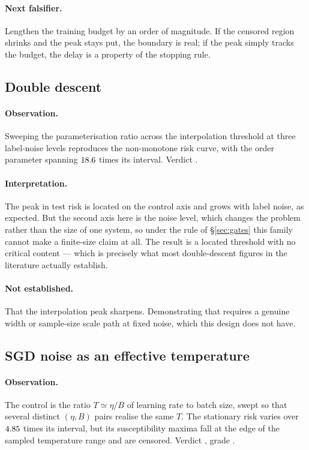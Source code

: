 \paragraph{Next falsifier.}
Lengthen the training budget by an order of magnitude. If the censored region
shrinks and the peak stays put, the boundary is real; if the peak simply tracks
the budget, the delay is a property of the stopping rule.

\subsection{Double descent}

\paragraph{Observation.}
Sweeping the parameterisation ratio across the interpolation threshold at three
label-noise levels reproduces the non-monotone risk curve, with the order
parameter spanning $18.6{}$ times its interval.
Verdict \emph{\AtlasDoubleDescentVerdict{}}.

\paragraph{Interpretation.}
The peak in test risk is located on the control axis and grows with label
noise, as expected. But the second axis here is the noise level, which changes
the problem rather than the size of one system, so under the rule of
\S\ref{sec:gates} this family cannot make a finite-size claim at all. The
result is a located threshold with no critical content --- which is precisely
what most double-descent figures in the literature actually establish.

\paragraph{Not established.}
That the interpolation peak sharpens. Demonstrating that requires a genuine
width or sample-size scale path at fixed noise, which this design does not have.

\subsection{SGD noise as an effective temperature}

\paragraph{Observation.}
The control is the ratio $T\simeq\eta/B$ of learning rate to batch size, swept
so that several distinct $(\eta,B)$ pairs realise the same $T$. The stationary
risk varies over $4.85{}$ times its interval, but
its susceptibility maxima fall at the edge of the sampled temperature range and
are censored. Verdict \emph{\AtlasSgdTemperatureVerdict{}}, grade
\AtlasSgdTemperatureGrade{}.

